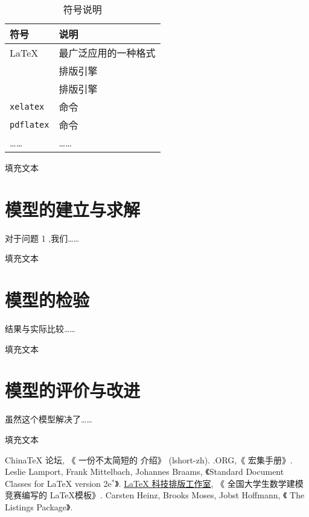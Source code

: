 \documentclass[timesfont,no-math]{JXUSTmodeling}%
\begin{document}
	\begin{table}
		\centering
		\caption{符号说明}\label{tab:symbol}
		\begin{tabularx}{0.8\textwidth}{YY}
			\toprule
			符号		&		说明		\\
			\midrule
			\LaTeX		&	最广泛应用的一种格式	\\
			\midrule	
				&	排版引擎	\\
			\midrule		
				&	排版引擎	\\
			\midrule
			\texttt{xelatex}	&	命令		\\
			\midrule
			\texttt{pdflatex}		&		命令		\\
			\midrule
			……			&		……				\\
			\bottomrule
		\end{tabularx}
	\end{table}
	填充文本
	
	\lipsum[5-6]
	
	\section{模型的建立与求解}\label{sec:4}
	对于问题 1 ,我们……
	
	填充文本
	
	\lipsum[7-8]
	\section{模型的检验}\label{sec:5}
	结果与实际比较……
	
	填充文本
	
	\lipsum[9-10]
	
	\section{模型的评价与改进}\label{sec:6}
	虽然这个模型解决了……
	
	填充文本
	
	\lipsum[11-12]
	
	\newpage
	\begin{thebibliography}{99}
		 China\TeX{} 论坛, 《 一份不太简短的 \LaTeXe{} 介绍》 (lshort-zh).
		 \CTeX.ORG,《\CTeX{} 宏集手册》.
			Leslie Lamport, Frank Mittelbach, Johannes Braams, 《Standard Document 
		Classes for \LaTeX{} version 2e${}^*$》.
		 \href{www.latexstudio.net}{\LaTeX{} 科技排版工作室}, 《 全国大学生数学建模竞赛编写的 \LaTeX 模板》.
		 Carsten Heinz, Brooks Moses, Jobst Hoffmann, 《 The Listings Package》.
	\end{thebibliography}
    \newpage
	\appendix
	
\end{document}
